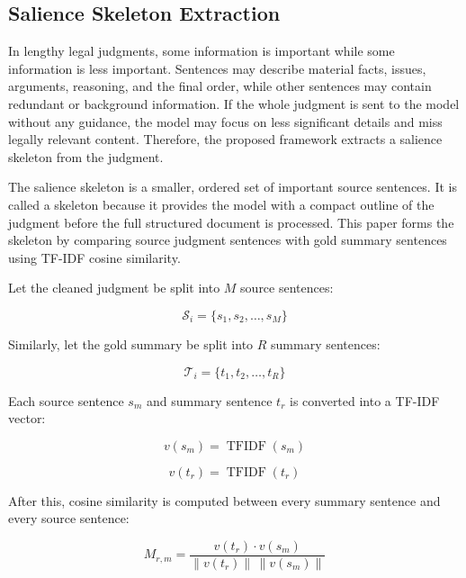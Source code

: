\subsection{Salience Skeleton Extraction}

In lengthy legal judgments, some information is important while some information is less important. Sentences may describe material facts, issues, arguments, reasoning, and the final order, while other sentences may contain redundant or background information. If the whole judgment is sent to the model without any guidance, the model may focus on less significant details and miss legally relevant content. Therefore, the proposed framework extracts a salience skeleton from the judgment.

The salience skeleton is a smaller, ordered set of important source sentences. It is called a skeleton because it provides the model with a compact outline of the judgment before the full structured document is processed. This paper forms the skeleton by comparing source judgment sentences with gold summary sentences using TF-IDF cosine similarity.

Let the cleaned judgment be split into \(M\) source sentences:

\begin{equation}
\mathcal{S}_i=\{s_1,s_2,\ldots,s_M\}
\end{equation}

Similarly, let the gold summary be split into \(R\) summary sentences:

\begin{equation}
\mathcal{T}_i=\{t_1,t_2,\ldots,t_R\}
\end{equation}

Each source sentence \(s_m\) and summary sentence \(t_r\) is converted into a TF-IDF vector:

\begin{equation}
v(s_m)=\operatorname{TFIDF}(s_m)
\end{equation}

\begin{equation}
v(t_r)=\operatorname{TFIDF}(t_r)
\end{equation}

After this, cosine similarity is computed between every summary sentence and every source sentence:

\begin{equation}
M_{r,m}=
\frac{v(t_r)\cdot v(s_m)}
{\lVert v(t_r)\rVert \, \lVert v(s_m)\rVert}
\end{equation}

